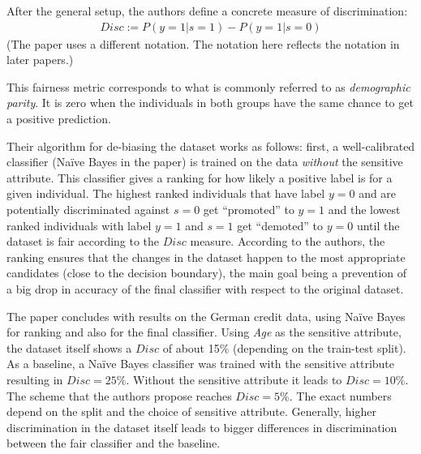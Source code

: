 After the general setup, the authors define a concrete measure of discrimination:
\begin{align}
  \label{eq:disc}
  Disc := P(y=1|s =1) - P(y=1|s = 0)
\end{align}
(The paper uses a different notation.
The notation here reflects the notation in later papers.)

This fairness metric corresponds to what is commonly referred to as \emph{demographic parity}.
It is zero when the individuals in both groups have the same chance to get a positive prediction.

Their algorithm for de-biasing the dataset works as follows:
first, a well-calibrated classifier (Na\"ive Bayes in the paper) is trained on the data
\emph{without} the sensitive attribute.
This classifier gives a ranking for how likely a positive label is for a given individual.
The highest ranked individuals that have label \(y=0\)
and are potentially discriminated against \(s=0\) get ``promoted'' to \(y=1\)
and the lowest ranked individuals with label \(y=1\) and \(s=1\) get ``demoted'' to \(y=0\)
until the dataset is fair according to the \(Disc\) measure.
According to the authors, the ranking ensures that the changes in the dataset
happen to the most appropriate candidates (close to the decision boundary),
the main goal being a prevention of a big drop in accuracy of the final classifier
with respect to the original dataset.

The paper concludes with results on the German credit data,
using Na\"ive Bayes for ranking and also for the final classifier.
Using \emph{Age} as the sensitive attribute,
the dataset itself shows a \(Disc\) of about 15\% (depending on the train-test split).
As a baseline, a Na\"ive Bayes classifier was trained with the sensitive attribute
resulting in \(Disc = 25\%\).
Without the sensitive attribute it leads to \(Disc = 10\%\).
The scheme that the authors propose reaches \(Disc = 5\%\).
The exact numbers depend on the split and the choice of sensitive attribute.
Generally, higher discrimination in the dataset itself
leads to bigger differences in discrimination between the fair classifier and the baseline.

